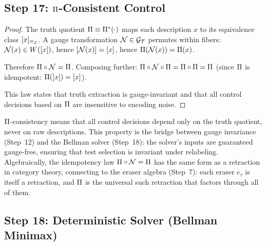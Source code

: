 
\subsection{Step 17: $\Pi$-Consistent Control}\label{app:step17}

\begin{proof}
The truth quotient $\Pi \equiv \Pi^*(\cdot)$ maps each description $x$ to
its equivalence class $[x]_{\equiv_{\mathcal{L}}}$.  A gauge transformation
$\mathcal{N} \in \mathcal{G}_{\mathcal{T}}$ permutes within fibers:
$\mathcal{N}(x) \in W([x])$, hence $[\mathcal{N}(x)] = [x]$, hence
$\Pi(\mathcal{N}(x)) = \Pi(x)$.

Therefore $\Pi \circ \mathcal{N} = \Pi$.  Composing further:
$\Pi \circ \mathcal{N} \circ \Pi = \Pi \circ \Pi = \Pi$ (since $\Pi$
is idempotent: $\Pi([x]) = [x]$).

This law states that truth extraction is gauge-invariant and that all
control decisions based on $\Pi$ are insensitive to encoding noise.

\end{proof}

\begin{remark}
\label{app:rem:pi-consistency-bridge}
$\Pi$-consistency means that all control decisions depend only on
the truth quotient, never on raw descriptions.  This property is the
bridge between gauge invariance (Step~12) and the Bellman solver
(Step~18): the solver's inputs are guaranteed gauge-free, ensuring that
test selection is invariant under relabeling.  Algebraically, the
idempotency law $\Pi \circ \mathcal{N} = \Pi$ has the same form as a
retraction in category theory, connecting to the eraser algebra
(Step~7): each eraser $e_\tau$ is itself a retraction, and $\Pi$ is
the universal such retraction that factors through all of them.
\end{remark}


\subsection{Step 18: Deterministic Solver (Bellman Minimax)}\label{app:step18}

